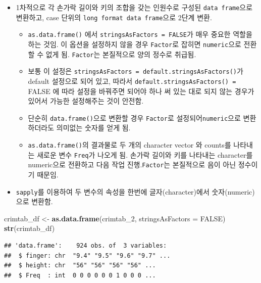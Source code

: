 \documentclass[
]{article}
\newenvironment{Shaded}{\begin{snugshade}}{\end{snugshade}}
\newcommand{\DataTypeTok}[1]{\textcolor[rgb]{0.13,0.29,0.53}{#1}}
\newcommand{\DecValTok}[1]{\textcolor[rgb]{0.00,0.00,0.81}{#1}}
\newcommand{\KeywordTok}[1]{\textcolor[rgb]{0.13,0.29,0.53}{\textbf{#1}}}
\newcommand{\NormalTok}[1]{#1}
\newcommand{\OtherTok}[1]{\textcolor[rgb]{0.56,0.35,0.01}{#1}}
\newcommand{\StringTok}[1]{\textcolor[rgb]{0.31,0.60,0.02}{#1}}
\providecommand{\tightlist}{%
  \setlength{\itemsep}{0pt}\setlength{\parskip}{0pt}}
\begin{document}
\begin{itemize}
\tightlist
\item
  1차적으로 각 손가락 길이와 키의 조합을 갖는 인원수로 구성된
  \texttt{data\ frame}으로 변환하고, case 단위의
  \texttt{long\ format\ data\ frame}으로 2단계 변환.

  \begin{itemize}
  \tightlist
  \item
    \texttt{as.data.frame()} 에서 \texttt{stringsAsFactors\ =\ FALSE}가
    매우 중요한 역할을 하는 것임. 이 옵션을 설정하지 않을 경우
    \texttt{Factor}로 잡히면 \texttt{numeric}으로 전환할 수 없게 됨.
    \texttt{Factor}는 본질적으로 양의 정수로 취급됨.
  \item
    보통 이 설정은
    \texttt{stringsAsFactors\ =\ default.stringsAsFactors()}가 default
    설정으로 되어 있고, 따라서 \texttt{default.stringsAsFactors()\ =}
    FALSE 에 따라 설정을 바꿔주면 되어야 하나 써 있는 대로 되지 않는
    경우가 있어서 가능한 설정해주는 것이 안전함.
  \item
    단순히 \texttt{data.frame()}으로 변환할 경우 \texttt{Factor}로
    설정되어\texttt{numeric}으로 변환하더라도 의미없는 숫자를 얻게 됨.
  \item
    \texttt{as.data.frame()}의 결과물로 두 개의 character vector 와
    counts를 나타내는 새로운 변수 \texttt{Freq}가 나오게 됨. 손가락
    길이와 키를 나타내는 character를 numeric으로 전환하고 다음 작업
    진행.\texttt{Factor}는 본질적으로 음이 아닌 정수이기 때문임.
  \end{itemize}
\item
  \texttt{sapply}를 이용하여 두 변수의 속성을 한번에 글자(character)에서
  숫자(numeric)으로 변환함.
\end{itemize}

\begin{Shaded}
\begin{Highlighting}[]
\NormalTok{crimtab_df <-}\StringTok{ }\KeywordTok{as.data.frame}\NormalTok{(crimtab_}\DecValTok{2}\NormalTok{, }
                            \DataTypeTok{stringsAsFactors =} \OtherTok{FALSE}\NormalTok{)}
\KeywordTok{str}\NormalTok{(crimtab_df)}
\end{Highlighting}
\end{Shaded}

\begin{verbatim}
## 'data.frame':    924 obs. of  3 variables:
##  $ finger: chr  "9.4" "9.5" "9.6" "9.7" ...
##  $ height: chr  "56" "56" "56" "56" ...
##  $ Freq  : int  0 0 0 0 0 0 1 0 0 0 ...
\end{verbatim}
\end{document}
